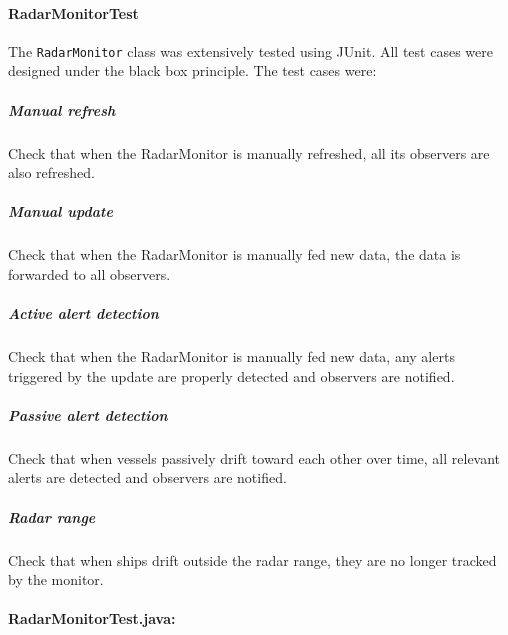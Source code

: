 \documentclass{article}
\begin{document}
\paragraph{RadarMonitorTest}

The \verb|RadarMonitor| class was extensively tested using JUnit. All test cases were designed under the black box principle. The test cases were:

\subparagraph{Manual refresh}
Check that when the RadarMonitor is manually refreshed, all its observers are also refreshed.

\subparagraph{Manual update}
Check that when the RadarMonitor is manually fed new data, the data is forwarded to all observers.

\subparagraph{Active alert detection}
Check that when the RadarMonitor is manually fed new data, any alerts triggered by the update are properly detected and observers are notified.

\subparagraph{Passive alert detection}
Check that when vessels passively drift toward each other over time, all relevant alerts are detected and observers are notified.

\subparagraph{Radar range}
Check that when ships drift outside the radar range, they are no longer tracked by the monitor.

\paragraph{RadarMonitorTest.java:}
\end{document}
